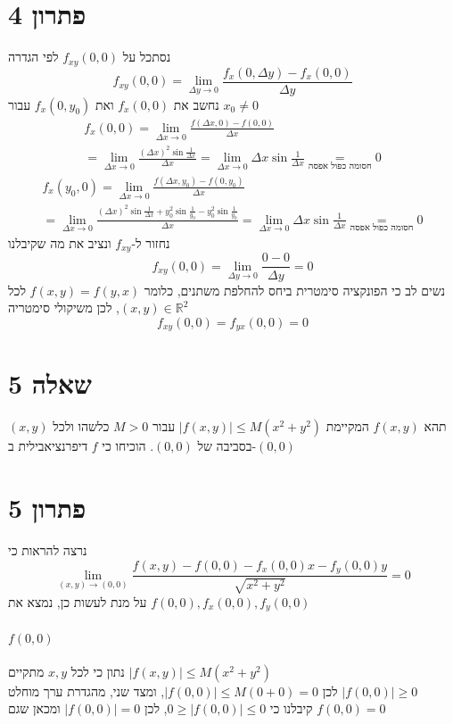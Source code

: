 \documentclass[12pt, titlepage]{article}
\begin{document}
\part*{פתרון 4}
נסתכל על $f_{xy}\left(0,0\right)$ לפי הגדרה
\[
    f_{xy}\left(0,0\right) = \lim_{\Delta y\to 0} \frac{f_x\left(0,\Delta y\right)-f_x\left(0,0\right)}{\Delta y}
\]
נחשב את $f_x\left(0,0\right)$ ואת $f_x\left(0,y_0\right)$ עבור $x_0 \neq 0$
\begin{gather*}
    f_x\left(0,0\right) = \lim_{\Delta x\to 0} \frac{f\left(\Delta x,0\right) - f\left(0,0\right)}{\Delta x} \\
    = \lim_{\Delta x \to 0} \frac{\left(\Delta x\right)^2 \sin \frac{1}{\Delta x}}{\Delta x} = \lim_{\Delta x\to0} \Delta x \sin \frac{1}{\Delta x} \underset{\text{חסומה כפול אפסה}}{=} 0
\end{gather*}
\begin{gather*}
    f_x\left(y_0,0\right) = \lim_{\Delta x \to 0}  \frac{f\left(\Delta x,y_0\right)-f\left(0,y_0\right)}{\Delta x}  \\
    = \lim_{\Delta x\to0} \frac{\left(\Delta x\right)^2 \sin\frac{1}{\Delta x}  +y_0^2 \sin\frac{1}{y_0} - y_0^2 \sin\frac{1}{y_0}}{\Delta x} = \lim_{\Delta x\to0} \Delta x \sin \frac{1}{\Delta x}\underset{\text{חסומה כפול אפסה}}{=} 0
\end{gather*}
נחזור ל-$f_{xy}$ ונציב את מה שקיבלנו
\[
f_{xy}\left(0,0\right) = \lim_{\Delta y \to 0} \frac{0-0}{\Delta y} = 0
\]
נשים לב כי הפונקציה סימטרית ביחס להחלפת משתנים, כלומר $f\left(x,y\right)=f\left(y,x\right)$ לכל $\left(x,y\right) \in \mathbb{R}^2$, לכן משיקולי סימטריה 
\[
    \boxed{f_{xy}\left(0,0\right) = f_{yx}\left(0,0\right) = 0}
\]
\newpage
\part*{שאלה 5}
תהא $f\left(x,y\right)$ המקיימת $\left|f\left(x,y\right)\right| \leq M\left(x^2+y^2\right)$ עבור $M>0$ כלשהו ולכל $\left(x,y\right)$ בסביבה של $\left(0,0\right)$. הוכיחו כי $f$ דיפרנציאבילית ב-$\left(0,0\right)$
\part*{פתרון 5}
נרצה להראות כי
\[
    \lim_{\left(x,y\right)\to\left(0,0\right)} \frac{f\left(x,y\right)-f\left(0,0\right)-f_x\left(0,0\right)x-f_y\left(0,0\right)y}{\sqrt{x^2+y^2}}= 0
\]
על מנת לעשות כן, נמצא את $f\left(0,0\right),f_x\left(0,0\right),f_y\left(0,0\right)$
\subsection*{$f\left(0,0\right)$}
נתון כי לכל $x,y$ מתקיים $\left|f\left(x,y\right)\right| \leq M\left(x^2+y^2\right)$\\
לכן
$\left|f\left(0,0\right)\right| \leq M\left(0+0\right) = 0$, ומצד שני, מהגדרת ערך מוחלט $\left|f\left(0,0\right)\right| \geq 0$\\
קיבלנו כי
$0 \geq \left|f\left(0,0\right)\right| \leq 0$, לכן $\left|f\left(0,0\right)\right|=0$ ומכאן שגם $\boxed{f\left(0,0\right)=0}$ 
\end{document}
